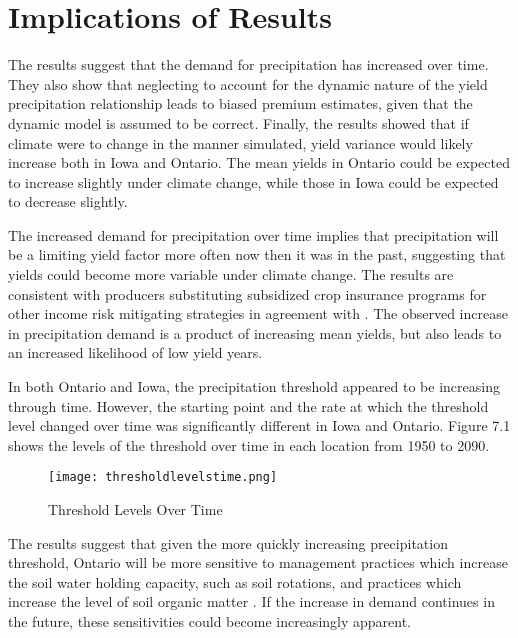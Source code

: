  
\section{Implications of Results}

The results suggest that the demand for precipitation has increased over time. They also show that neglecting to account for the dynamic nature of the yield precipitation relationship leads to biased premium estimates, given that the dynamic model is assumed to be correct. Finally, the results showed that if climate were to change in the manner simulated, yield variance would likely increase both in Iowa and Ontario. The mean yields in Ontario could be expected to increase slightly under climate change, while those in Iowa could be expected to decrease slightly.

The increased demand for precipitation over time implies that precipitation will be a limiting yield factor more often now then it was in the past, suggesting that yields could become more variable under climate change. The results are consistent with producers substituting subsidized crop insurance programs for other income risk mitigating strategies in agreement with \citep{kerRMP2016}. The observed increase in precipitation demand is a product of increasing mean yields, but also leads to an increased likelihood of low yield years. 

In both Ontario and Iowa, the precipitation threshold appeared to be increasing through time. However, the starting point and the rate at which the threshold level changed over time was significantly different in Iowa and Ontario. Figure 7.1 shows the levels of the threshold over time in each location from 1950 to 2090.

\begin{figure}
 \texttt{[image: thresholdlevelstime.png]}
    \caption{Threshold Levels Over Time}
 \end{figure}

The results suggest that given the more quickly increasing precipitation threshold, Ontario will be more sensitive to management practices which increase the soil water holding capacity, such as soil rotations, and practices which increase the level of soil organic matter \citep{williams2016soil}. If the increase in demand continues in the future, these sensitivities could become increasingly apparent.

